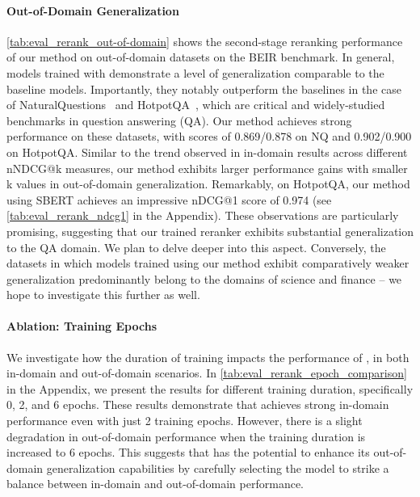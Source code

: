 \documentclass{article}
\begin{document}
\paragraph{Out-of-Domain Generalization} 
\autoref{tab:eval_rerank_out-of-domain} shows the second-stage reranking performance of our method on out-of-domain datasets on the BEIR benchmark. In general, models trained with \alg{} demonstrate a level of generalization comparable to the baseline models.
Importantly, they notably outperform the baselines in the case of NaturalQuestions~\citep[NQ;][]{Kwiatkowski2019NaturalQA} and HotpotQA~\citep{Yang2018HotpotQAAD}, which are critical and widely-studied benchmarks in question answering (QA).
Our method achieves strong performance on these datasets, with scores of 0.869/0.878 on NQ and 0.902/0.900 on HotpotQA. Similar to the trend observed in in-domain results across different nNDCG@k measures, our method exhibits larger performance gains with smaller k values in out-of-domain generalization. Remarkably, on HotpotQA, our method using SBERT achieves an impressive nDCG@1 score of 0.974 (see \autoref{tab:eval_rerank_ndcg1} in the Appendix).
These observations are particularly promising, suggesting that our trained reranker exhibits substantial generalization to the QA domain. We plan to delve deeper into this aspect. Conversely, the datasets in which models trained using our method exhibit comparatively weaker generalization predominantly belong to the domains of science and finance -- we hope to investigate this further as well.


\paragraph{Ablation: Training Epochs}
We investigate how the duration of training impacts the performance of \alg{}, in both in-domain and out-of-domain scenarios. In \autoref{tab:eval_rerank_epoch_comparison} in the Appendix, we present the results for different training duration, specifically 0, 2, and 6 epochs. These results demonstrate that \alg{} achieves strong in-domain performance even with just 2 training epochs. However, there is a slight degradation in out-of-domain performance when the training duration is increased to 6 epochs. This suggests that \alg{} has the potential to enhance its out-of-domain generalization capabilities by carefully selecting the model to strike a balance between in-domain and out-of-domain performance.
\end{document}
